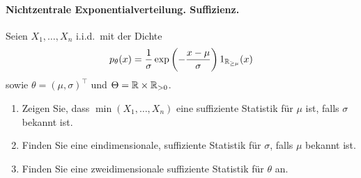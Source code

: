 \paragraph{Nichtzentrale Exponentialverteilung. Suffizienz.}
Seien $X_1,\ldots,X_n$ i.i.d.\ mit der Dichte
\begin{equation*}
	p_\theta (x) = \frac{1}{\sigma} \exp \left(-\frac{x-\mu}{\sigma} \right) 1_{\mathbb R_{\geq\mu}}(x)
\end{equation*}
sowie $\theta = (\mu, \sigma)^\top$ und $\Theta = \mathbb R \times \mathbb R_{>0}$. 
\begin{enumerate}
    \item Zeigen Sie, dass $\min(X_1,\ldots,X_n)$ eine suffiziente Statistik
        für $\mu$ ist, falls $\sigma$ bekannt ist.
    \item Finden Sie eine eindimensionale, suffiziente Statistik für $\sigma$,
        falls $\mu$ bekannt ist.
    \item Finden Sie eine zweidimensionale suffiziente Statistik für $\theta$ an.
\end{enumerate}

